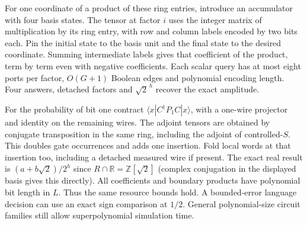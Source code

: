 \documentclass[11pt]{article}
\newcommand{\Z}{\mathbb Z}
\begin{document}
For one coordinate of a product of these ring entries, introduce an accumulator with four basis states. The tensor at factor $i$ uses the integer matrix of multiplication by its ring entry, with row and column labels encoded by two bits each. Pin the initial state to the basis unit and the final state to the desired coordinate. Summing intermediate labels gives that coefficient of the product, term by term even with negative coefficients. Each scalar query has at most eight ports per factor, $O(G+1)$ Boolean edges and polynomial encoding length. Four answers, detached factors and $\sqrt{2}^{\,h}$ recover the exact amplitude.

For the probability of bit one contract $\langle x|C^\dagger P_1 C|x\rangle$, with a one-wire projector and identity on the remaining wires. The adjoint tensors are obtained by conjugate transposition in the same ring, including the adjoint of controlled-$S$. This doubles gate occurrences and adds one insertion. Fold local words at that insertion too, including a detached measured wire if present. The exact real result is $(a+b\sqrt2)/2^h$ since $R\cap\mathbb R=\Z[\sqrt2]$ (complex conjugation in the displayed basis gives this directly). All coefficients and boundary products have polynomial bit length in $L$. Thus the same resource bounds hold. A bounded-error language decision can use an exact sign comparison at $1/2$. General polynomial-size circuit families still allow superpolynomial simulation time.
\end{document}
